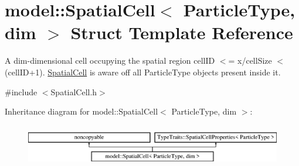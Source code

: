 \hypertarget{structmodel_1_1_spatial_cell}{}\section{model\+:\+:Spatial\+Cell$<$ Particle\+Type, dim $>$ Struct Template Reference}
\label{structmodel_1_1_spatial_cell}


A dim-\/dimensional cell occupying the spatial region cell\+I\+D $<$= x/cell\+Size $<$ (cell\+I\+D+1). \hyperlink{structmodel_1_1_spatial_cell}{Spatial\+Cell} is aware off all Particle\+Type objects present inside it.  




{\ttfamily \#include $<$Spatial\+Cell.\+h$>$}

Inheritance diagram for model\+:\+:Spatial\+Cell$<$ Particle\+Type, dim $>$\+:\begin{figure}[H]
\begin{center}
\leavevmode
\includegraphics[height=1.879195cm]{structmodel_1_1_spatial_cell}
\end{center}
\end{figure}
